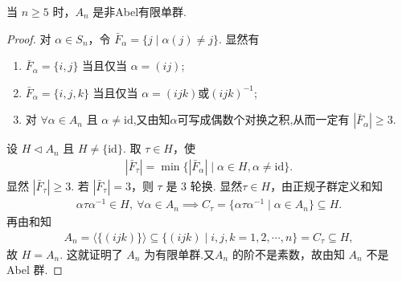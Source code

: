 \documentclass[../../main.tex]{subfiles}%
\begin{document}
\begin{theorem}\label{theorem:A_n是非Abel有限单群}
当 \( n \geqslant 5 \) 时，\( A_n \) 是非Abel有限单群.
\end{theorem}
\begin{proof}

对 \( \alpha \in S_n \)，令 \( \bar{F}_\alpha = \{j \mid \alpha(j) \neq j\} \). 显然有
\begin{enumerate}[(1)]
\item\label{theorem:A_n是非Abel有限单群-证明-情况1} \( \bar{F}_\alpha = \{i, j\} \) 当且仅当 \( \alpha = (ij) \);

\item \( \bar{F}_\alpha = \{i, j, k\} \) 当且仅当 \( \alpha = (ijk)\text{或}(ijk)^{-1} \);

\item 对 \( \forall \alpha \in A_n \) 且 \( \alpha \neq \mathrm{id} \),又由知$\alpha$可写成偶数个对换之积,从而一定有 \( |\bar{F}_\alpha| \geqslant 3 \).
\end{enumerate}
设 \( H \lhd A_n \) 且 \( H \neq \{\mathrm{id}\} \). 取 \( \tau \in H \)，使
\begin{align}\label{eq::infoj4fj3fminfo8ju43}
|\bar{F}_\tau| = \min\{|\bar{F}_\alpha| \mid \alpha \in H, \alpha \neq \mathrm{id}\}.
\end{align}
显然 \( |\bar{F}_\tau| \geqslant 3 \). 若 \( |\bar{F}_\tau| = 3 \)，则 \( \tau \) 是 3 轮换. 
显然$\tau \in H$，由正规子群定义和知
\begin{align*}
\alpha \tau \alpha^{-1} \in H,\ \forall \alpha \in A_n \implies C_{\tau} = \{ \alpha \tau \alpha^{-1} \mid \alpha \in A_n \} \subseteq H.
\end{align*}
再由和知
\begin{align*}
A_n = \langle \{(ijk)\} \rangle \subseteq \{(ijk)\mid i,j,k=1,2,\cdots,n\} = C_\tau \subseteq H,
\end{align*}
故 \( H = A_n \). 这就证明了 \( A_n \) 为有限单群.又\( A_n \) 的阶不是素数，故由知 \( A_n \) 不是 Abel 群.


\end{proof}
\end{document}
